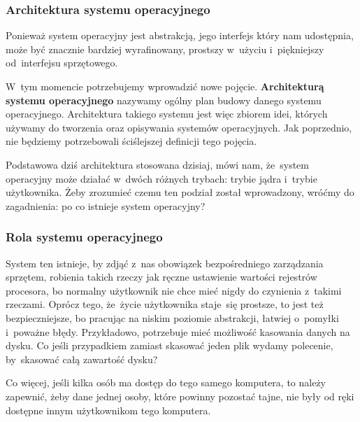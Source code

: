 \documentclass[10pt,t]{beamer}
\begin{document}
\begin{frame}
  \frametitle{Architektura systemu operacyjnego}


  Ponieważ system operacyjny jest abstrakcją, jego interfejs który
  nam udostępnia, może być znacznie bardziej wyrafinowany, prostszy
  w~użyciu i~piękniejszy od~interfejsu sprzętowego.

  W~tym momencie potrzebujemy wprowadzić nowe pojęcie.
  \textbf{Architekturą systemu operacyjnego} nazywamy ogólny plan budowy
  danego systemu operacyjnego. Architektura takiego systemu jest więc
  zbiorem idei, których używamy do tworzenia oraz opisywania systemów
  operacyjnych. Jak poprzednio, nie będziemy potrzebowali ściślejszej
  definicji tego pojęcia.

  Podstawowa dziś architektura stosowana dzisiaj, mówi nam, że~system
  operacyjny może działać w~dwóch różnych trybach: trybie jądra i~trybie
  użytkownika. Żeby zrozumieć czemu ten podział został wprowadzony,
  wróćmy do zagadnienia: po co istnieje system operacyjny?

\end{frame}





\begin{frame}
  \frametitle{Rola systemu operacyjnego}


  System ten istnieje, by zdjąć z~nas obowiązek bezpośredniego zarządzania
  sprzętem, robienia takich rzeczy jak ręczne ustawienie wartości rejestrów
  procesora, bo normalny użytkownik nie chce mieć nigdy do czynienia
  z~takimi rzeczami. Oprócz tego, że~życie użytkownika staje~się prostsze,
  to jest też bezpieczniejsze, bo pracując na niskim poziomie abstrakcji,
  łatwiej o~pomyłki i~poważne błędy. Przykładowo, potrzebuje mieć możliwość
  kasowania danych na dysku. Co jeśli przypadkiem zamiast skasować jeden
  plik wydamy polecenie, by~skasować całą zawartość dysku?

  Co więcej, jeśli kilka osób ma dostęp do tego samego komputera, to
  należy zapewnić, żeby dane jednej osoby, które powinny pozostać tajne, nie
  były od ręki dostępne innym użytkownikom tego komputera.

\end{frame}
\end{document}
